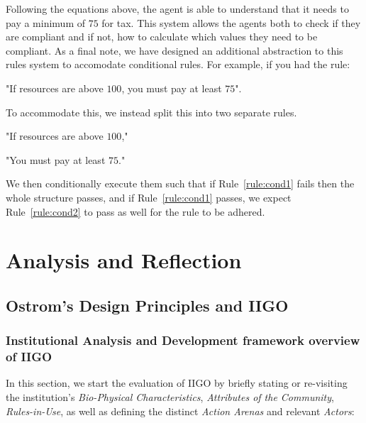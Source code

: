 Following the equations above, the agent is able to understand that it needs to pay a minimum of $75$ for tax. This system allows the agents both to check if they are compliant and if not, how to calculate which values they need to be compliant.
As a final note, we have designed an additional abstraction to this rules system to accomodate conditional rules.
For example, if you had the rule:
\begin{rule_IIGO}
    "If resources are above $100$, you must pay at least $75$".
\end{rule_IIGO} 
To accommodate this, we instead split this into two separate rules.
\begin{rule_IIGO}
    "If resources are above $100$,"
    \label{rule:cond1}
\end{rule_IIGO}
\begin{rule_IIGO}
    "You must pay at least $75$."
    \label{rule:cond2}
\end{rule_IIGO}
We then conditionally execute them such that if Rule~\ref{rule:cond1} fails then the whole structure passes, and if Rule~\ref{rule:cond1} passes, we expect Rule~\ref{rule:cond2} to pass as well for the rule to be adhered.

\section{Analysis and Reflection}
\subsection{Ostrom’s Design Principles and IIGO}
\subsubsection{Institutional Analysis and Development framework overview of IIGO}

In this section, we start the evaluation of IIGO by briefly stating or re-visiting the institution's \emph{Bio-Physical Characteristics}, \emph{Attributes of the Community}, \emph{Rules-in-Use}, as well as defining the distinct \emph{Action Arenas} and relevant \emph{Actors}:

